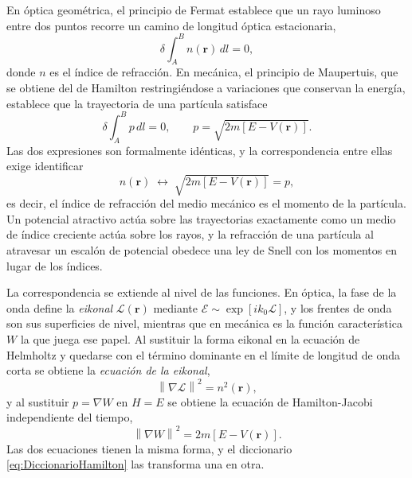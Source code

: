        En óptica geométrica, el principio de Fermat establece que un rayo luminoso entre dos puntos recorre un camino de longitud óptica estacionaria,
        \begin{equation}\label{eq:Fermat}
            \delta\int_{A}^{B} n(\mathbf{r})\,dl = 0,
        \end{equation}
        donde $n$ es el índice de refracción. En mecánica, el principio de Maupertuis, que se obtiene del de Hamilton restringiéndose a variaciones que conservan la energía, establece que la trayectoria de una partícula satisface
        \begin{equation}\label{eq:Maupertuis}
            \delta\int_{A}^{B} p\,dl = 0,
            \qquad
            p = \sqrt{2m\left[E - V(\mathbf{r})\right]} .
        \end{equation}
        Las dos expresiones son formalmente idénticas, y la correspondencia entre ellas exige identificar
        \begin{equation}\label{eq:DiccionarioHamilton}
            n(\mathbf{r}) \;\longleftrightarrow\; \sqrt{2m\left[E-V(\mathbf{r})\right]} = p,
        \end{equation}
        es decir, el índice de refracción del medio mecánico es el momento de la partícula. Un potencial atractivo actúa sobre las trayectorias exactamente como un medio de índice creciente actúa sobre los rayos, y la refracción de una partícula al atravesar un escalón de potencial obedece una ley de Snell con los momentos en lugar de los índices.

        La correspondencia se extiende al nivel de las funciones. En óptica, la fase de la onda define la \textit{eikonal} $\mathcal{L}(\mathbf{r})$ mediante $\mathcal{E} \sim \exp\left[ik_{0}\mathcal{L}\right]$, y los frentes de onda son sus superficies de nivel, mientras que en mecánica es la función característica $W$ la que juega ese papel. Al sustituir la forma eikonal en la ecuación de Helmholtz y quedarse con el término dominante en el límite de longitud de onda corta se obtiene la \textit{ecuación de la eikonal},
        \begin{equation}\label{eq:Eikonal}
            \left\|\nabla\mathcal{L}\right\|^{2} = n^{2}(\mathbf{r}),
        \end{equation}
        y al sustituir $p = \nabla W$ en $H = E$ se obtiene la ecuación de Hamilton-Jacobi independiente del tiempo,
        \begin{equation}\label{eq:HJIndependiente}
            \left\|\nabla W\right\|^{2} = 2m\left[E - V(\mathbf{r})\right] .
        \end{equation}
        Las dos ecuaciones tienen la misma forma, y el diccionario \eqref{eq:DiccionarioHamilton} las transforma una en otra.


